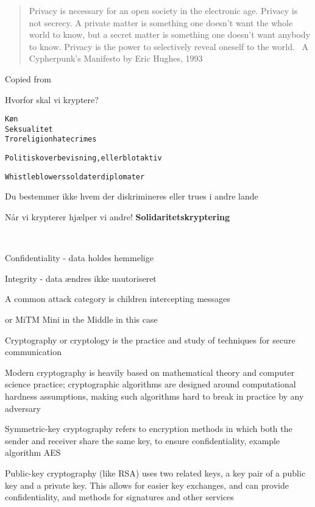\documentclass[Screen16to9,17pt]{foils}
\begin{document}



\begin{quote}
	Privacy is necessary for an open society in the electronic age. Privacy is not secrecy. A private matter is something one doesn't want the whole world to know, but a secret matter is something one doesn't want anybody to know. Privacy is the power to selectively reveal oneself to the world. ~A Cypherpunk's Manifesto by Eric Hughes, 1993
\end{quote}

Copied from 



Hvorfor skal vi kryptere?

\begin{alltt}
       Køn
                       Seksualitet
 Tro religion       hatecrimes

 Politisk overbevisning, eller blot aktiv

 Whistleblowers             soldater      diplomater
\end{alltt}

\centerline{Du bestemmer ikke hvem der diskrimineres eller trues i andre lande}

\vskip2cm

Når vi krypterer hjælper vi andre! {\bf Solidaritetskryptering}



{~}

\begin{list2}
\item Confidentiality - data holdes hemmelige
\item Integrity - data ændres ikke uautoriseret
\item A common attack category is children intercepting messages
\item or MiTM Mini in the Middle in this case
\end{list2}


\begin{list1}
\item Cryptography or cryptology is the practice and study of techniques for secure communication
\item Modern cryptography is heavily based on mathematical theory and computer science practice; cryptographic algorithms are designed around computational hardness assumptions, making such algorithms hard to break in practice by any adversary
\item Symmetric-key cryptography refers to encryption methods in which both the sender and receiver share the same key, to ensure confidentiality, example algorithm AES
\item Public-key cryptography (like RSA) uses two related keys, a key pair of a public key and a private key. This allows for easier key exchanges, and can provide confidentiality, and methods for signatures and other services
\end{list1}
\end{document}
